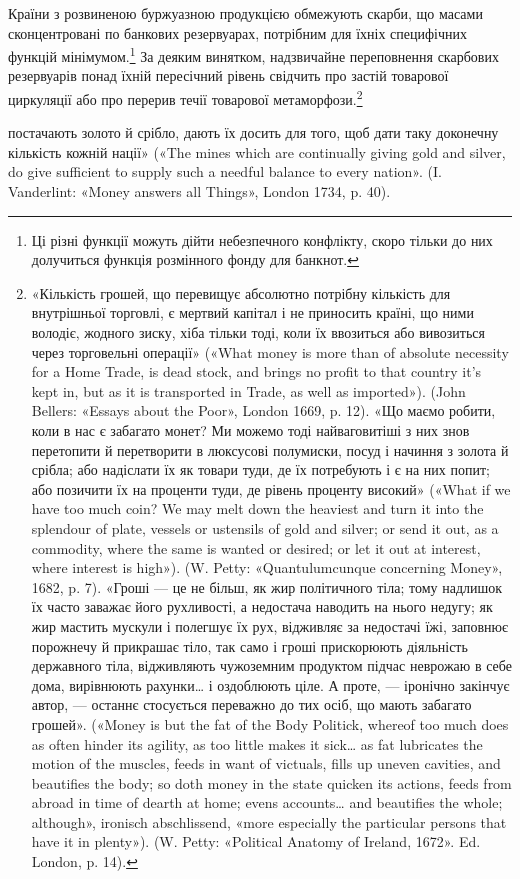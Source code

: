 Країни з розвиненою буржуазною продукцією обмежують
скарби, що масами сконцентровані по банкових резервуарах,
потрібним для їхніх специфічних функцій мінімумом.\footnote{
Ці різні функції можуть дійти небезпечного конфлікту, скоро
тільки до них долучиться функція розмінного фонду для банкнот.
} За
деяким винятком, надзвичайне переповнення скарбових резервуарів
понад їхній пересічний рівень свідчить про застій товарової
циркуляції або про перерив течії товарової метаморфози.\footnote{
«Кількість грошей, що перевищує абсолютно потрібну кількість
для внутрішньої торговлі, є мертвий капітал і не приносить країні, що
ними володіє, жодного зиску, хіба тільки тоді, коли їх ввозиться
або вивозиться через торговельні операції» («What money is more than
of absolute necessity for a Home Trade, is dead stock, and brings no profit
to that country it’s kept in, but as it is transported in Trade, as well as
imported»). (John Bellers: «Essays about the Poor», London 1669, p. 12).
«Що маємо робити, коли в нас є забагато монет? Ми можемо тоді найваговитіші
з них знов перетопити й перетворити в люксусові полумиски,
посуд і начиння з золота й срібла; або надіслати їх як товари туди, де їх
потребують і є на них попит; або позичити їх на проценти туди, де рівень
проценту високий» («What if we have too much coin? We may melt down
the heaviest and turn it into the splendour of plate, vessels or ustensils of
gold and silver; or send it out, as a commodity, where the same is wanted
or desired; or let it out at interest, where interest is high»). (W. Petty:
«Quantulumcunque concerning Money», 1682, p. 7). «Гроші — це не
більш, як жир політичного тіла; тому надлишок їх часто заважає його
рухливості, а недостача наводить на нього недугу; як жир мастить мускули
і полегшує їх рух, відживляє за недостачі їжі, заповнює порожнечу й
прикрашає тіло, так само і гроші прискорюють діяльність державного
тіла, відживляють чужоземним продуктом підчас неврожаю в себе дома,
вирівнюють рахунки\dots{} і оздоблюють ціле. А проте, — іронічно закінчує
автор, — останнє стосується переважно до тих осіб, що мають забагато
грошей». («Money is but the fat of the Body Politick, whereof too much
does as often hinder its agility, as too little makes it sick\dots{} as fat lubricates
the motion of the muscles, feeds in want of victuals, fills up uneven cavities,
and beautifies the body; so doth money in the state quicken its actions,
feeds from abroad in time of dearth at home; evens accounts\dots{} and beautifies
the whole; although», ironisch abschlissend, «more especially the particular
persons that have it in plenty»). (W. Petty: «Political Anatomy
of Ireland, 1672». Ed. London, p. 14).
}

постачають золото й срібло, дають їх досить для того, щоб дати таку
доконечну кількість кожній нації» («The mines which are continually giving
gold and silver, do give sufficient to supply such a needful balance to every
nation». (I. Vanderlint: «Money answers all Things», London 1734, p. 40).
